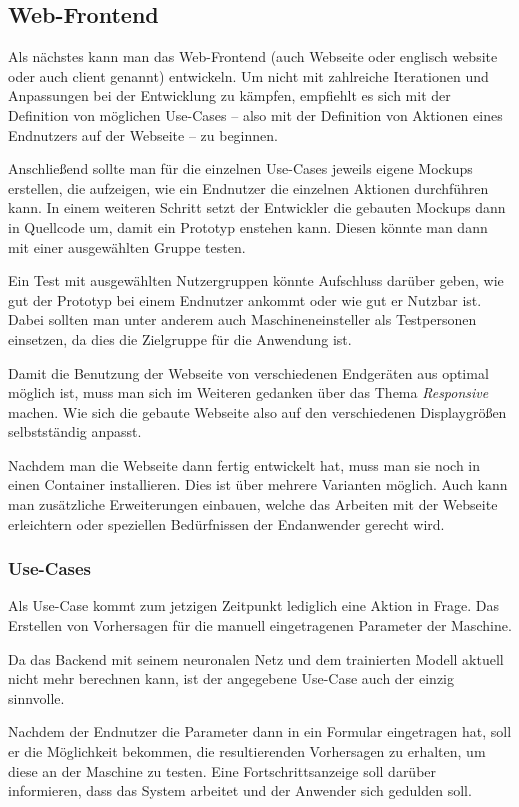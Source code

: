 \subsection{Web-Frontend}
\label{subsec:webseite}
Als nächstes kann man das Web-Frontend (auch Webseite oder englisch website oder auch client genannt) entwickeln. Um
nicht mit zahlreiche Iterationen und Anpassungen bei der Entwicklung zu kämpfen, empfiehlt es sich mit der Definition
von möglichen Use-Cases -- also mit der Definition von Aktionen eines Endnutzers auf der Webseite -- zu beginnen.

Anschließend sollte man für die einzelnen Use-Cases jeweils eigene Mockups erstellen, die aufzeigen, wie ein Endnutzer
die einzelnen Aktionen durchführen kann. In einem weiteren Schritt setzt der Entwickler die gebauten Mockups dann in
Quellcode um, damit ein Prototyp enstehen kann. Diesen könnte man dann mit einer ausgewählten Gruppe testen.

Ein Test mit ausgewählten Nutzergruppen könnte Aufschluss darüber geben, wie gut der Prototyp bei einem Endnutzer
ankommt oder wie gut er Nutzbar ist. Dabei sollten man unter anderem auch Maschineneinsteller als Testpersonen
einsetzen, da dies die Zielgruppe für die Anwendung ist.

Damit die Benutzung der Webseite von verschiedenen Endgeräten aus optimal möglich ist, muss man sich im Weiteren
gedanken über das Thema \textit{Responsive} machen. Wie sich die gebaute Webseite also auf den verschiedenen
Displaygrößen selbstständig anpasst.

Nachdem man die Webseite dann fertig entwickelt hat, muss man sie noch in einen Container installieren. Dies ist über
mehrere Varianten möglich. Auch kann man zusätzliche Erweiterungen einbauen, welche das Arbeiten mit der Webseite
erleichtern oder speziellen Bedürfnissen der Endanwender gerecht wird.

\subsubsection{Use-Cases}
Als Use-Case kommt zum jetzigen Zeitpunkt lediglich eine Aktion in Frage. Das Erstellen von Vorhersagen für die manuell
eingetragenen Parameter der Maschine.

Da das Backend mit seinem neuronalen Netz und dem trainierten Modell aktuell nicht mehr berechnen kann, ist der
angegebene Use-Case auch der einzig sinnvolle.

Nachdem der Endnutzer die Parameter dann in ein Formular eingetragen hat, soll er die Möglichkeit bekommen, die
resultierenden Vorhersagen zu erhalten, um diese an der Maschine zu testen. Eine Fortschrittsanzeige soll darüber
informieren, dass das System arbeitet und der Anwender sich gedulden soll.

